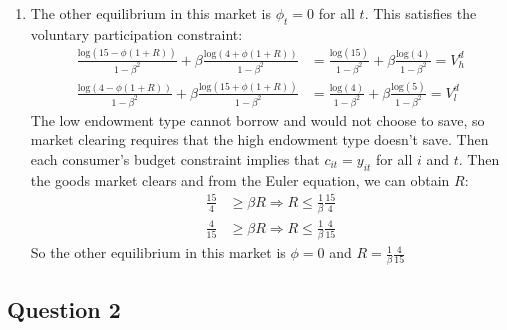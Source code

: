 \documentclass{article}
\newcommand{\loge}[1]{\text{log}\left(#1\right)}
\begin{document}
\begin{enumerate}
	\item The other equilibrium in this market is ${\phi_t=0}$ for all $t$. This satisfies the voluntary participation constraint:
		\begin{align*}
			\frac{\loge{15-\phi(1+R)}}{1-\beta^2} + \beta\frac{\loge{4+\phi(1+R)}}{1-\beta^2} &= 
				\frac{\loge{15}}{1-\beta^2} + \beta\frac{\loge{4}}{1-\beta^2} = V^d_h				\\
			\frac{\loge{4-\phi(1+R)}}{1-\beta^2} + \beta\frac{\loge{15+\phi(1+R)}}{1-\beta^2} &= 
				\frac{\loge{4}}{1-\beta^2} + \beta\frac{\loge{5}}{1-\beta^2} = V^d_l				
		\end{align*}
		The low endowment type cannot borrow and would not choose to save, so market clearing requires that the high endowment type doesn't save. Then each consumer's budget constraint implies that ${c_{it}=y_{it}}$ for all $i$ and $t$. Then the goods market clears and from the Euler equation, we can obtain $R$:
		\begin{align*}
			\frac{15}{4}	&\geq \beta R	\Rightarrow R \leq \frac{1}{\beta}\frac{15}{4}\\
			\frac{4}{15}	&\geq \beta R	\Rightarrow R \leq \frac{1}{\beta}\frac{4}{15}
		\end{align*}
		So the other equilibrium in this market is ${\phi=0}$ and ${R = \frac{1}{\beta}\frac{4}{15}}$
	
\end{enumerate}


\pagebreak
\subsection*{Question 2}
\end{document}
